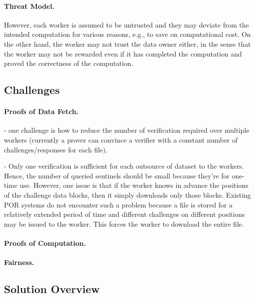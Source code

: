 \paragraph{Threat Model.}
However, each worker is assumed to be untrusted and they may deviate from the intended computation for various reasons, e.g., to save on computational cost. 
On the other hand, the worker may not trust the data owner either, in the sense that the worker may not be rewarded even if it has completed the computation and proved the correctness of the computation.


\subsection{Challenges} \label{sect:challenges}

\paragraph{Proofs of Data Fetch.}
- one challenge is how to reduce the number of verification required over multiple workers (currently a prover can convince a verifier with a constant number of challenges/responses for each file). 

- Only one verification is sufficient for each outsource of dataset to the workers. Hence, the number of queried sentinels should be small because they're for one-time use. However, one issue is that if the worker knows in advance the positions of the challenge data blocks, then it simply downloads only those blocks. Existing POR systems do not encounter such a problem because a file is stored for a relatively extended period of time and different challenges on different positions may be issued to the worker. This forces the worker to download the entire file.

\paragraph{Proofs of Computation.}


\paragraph{Fairness.}



\subsection{Solution Overview} \label{sect:solution}

